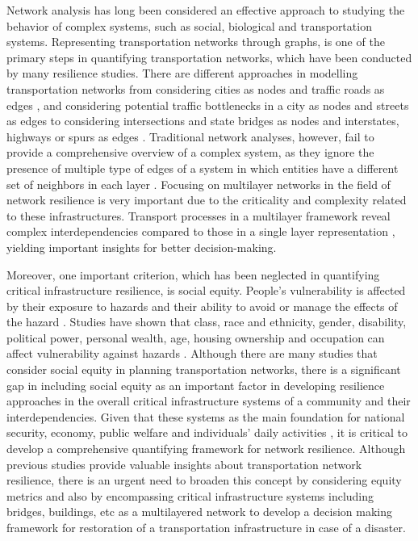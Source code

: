 \documentclass[11pt,twoside]{article}
\numberwithin{equation}{section}
\newcommand{\?}{\stackrel{?}{=}}
\begin{document}
Network analysis has long been considered an effective approach to studying the behavior of complex systems, such as social, biological and transportation systems. Representing transportation networks through graphs, is one of the primary steps in quantifying transportation networks, which have been conducted by many resilience studies. There are different approaches in modelling transportation networks from considering cities as nodes and traffic roads as edges \citep{ip2009resilience}, and considering potential traffic bottlenecks in a city as nodes and streets as edges \citep{das2020approach} to considering intersections and state bridges as nodes and interstates, highways or spurs as edges \citep{antony2017developing}.
Traditional network analyses, however, fail to provide a comprehensive overview of a complex system, as they ignore the presence of multiple type of edges of a system in which entities have a different set of neighbors in each layer \citep{domenico2013mathematical}. Focusing on multilayer networks in the field of network resilience is very important due to the criticality and complexity related to these infrastructures. Transport processes in a multilayer framework reveal complex interdependencies compared to those in a single layer representation \citep{wu2020traffica}, yielding important insights for better decision-making.

Moreover, one important criterion, which has been neglected in quantifying critical infrastructure resilience, is social equity. People’s vulnerability is affected by their exposure to hazards and their ability to avoid or manage the effects of the hazard \citep{cutter1995race}.  Studies have shown that class, race and ethnicity, gender, disability, political power, personal wealth, age, housing ownership and occupation can affect vulnerability against hazards \citep{bolin2018race, cutter1995race}. Although there are many studies that consider social equity in planning transportation networks, there is a significant gap in including social equity as an important factor in developing resilience approaches in the overall critical infrastructure systems of a community and their interdependencies.
Given that these systems as the main foundation for national security, economy, public welfare and individuals’ daily activities \citep{qiang2019empirical}, it is critical to develop a comprehensive quantifying framework for network resilience. Although previous studies provide valuable insights about transportation network resilience, there is an urgent need to broaden this concept by considering equity metrics and also by encompassing critical infrastructure systems including bridges, buildings, etc as a multilayered network to develop a decision making framework for restoration of a transportation infrastructure in case of a disaster.
\end{document}
